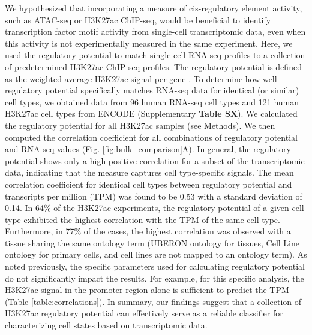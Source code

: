 We hypothesized that incorporating a measure of cis-regulatory element activity, such as ATAC-seq or H3K27ac ChIP-seq, would be beneficial to identify transcription factor motif activity from single-cell transcriptomic data, even when this activity is not experimentally measured in the same experiment. Here, we used the regulatory potential to match single-cell RNA-seq profiles to a collection of predetermined H3K27ac ChIP-seq profiles. The regulatory potential is defined as the weighted average H3K27ac signal per gene \cite{Wang2016}. To determine how well regulatory potential specifically matches RNA-seq data for identical (or similar) cell types, we obtained data from 96 human RNA-seq cell types and 121 human H3K27ac cell types from ENCODE\cite{encode_dcc} (Supplementary \textbf{Table SX}). We calculated the regulatory potential for all H3K27ac samples (see Methods). We then computed the correlation coefficient for all combinations of regulatory potential and RNA-seq values (Fig. \ref{fig:bulk_comparison}A). In general, the regulatory potential shows only a high positive correlation for a subset of the transcriptomic data, indicating that the measure captures cell type-specific signals. The mean correlation coefficient for identical cell types between regulatory potential and transcripts per million (TPM) was found to be 0.53 with a standard deviation of 0.14. In 64\% of the H3K27ac experiments, the regulatory potential of a given cell type exhibited the highest correlation with the TPM of the same cell type. Furthermore, in 77\% of the cases, the highest correlation was observed with a tissue sharing the same ontology term (UBERON ontology for tissues, Cell Line ontology for primary cells, and cell lines are not mapped to an ontology term). As noted previously\cite{Wang2016}, the specific parameters used for calculating regulatory potential do not significantly impact the results. For example, for this specific analysis, the H3K27ac signal in the promoter region alone is sufficient to predict the TPM (Table \ref{table:correlations}). In summary, our findings suggest that a collection of H3K27ac regulatory potential can effectively serve as a reliable classifier for characterizing cell states based on transcriptomic data.

